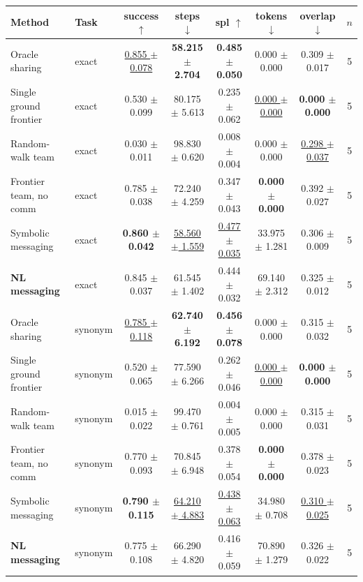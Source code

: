 \begin{tabular}{llcccccc}
\toprule
Method & Task & success $\uparrow$ & steps $\downarrow$ & spl $\uparrow$ & tokens $\downarrow$ & overlap $\downarrow$ & $n$ \\
\midrule
Oracle sharing & exact & \underline{0.855 $\pm$ 0.078} & \textbf{58.215 $\pm$ 2.704} & \textbf{0.485 $\pm$ 0.050} & 0.000 $\pm$ 0.000 & 0.309 $\pm$ 0.017 & 5 \\
Single ground frontier & exact & 0.530 $\pm$ 0.099 & 80.175 $\pm$ 5.613 & 0.235 $\pm$ 0.062 & \underline{0.000 $\pm$ 0.000} & \textbf{0.000 $\pm$ 0.000} & 5 \\
Random-walk team & exact & 0.030 $\pm$ 0.011 & 98.830 $\pm$ 0.620 & 0.008 $\pm$ 0.004 & 0.000 $\pm$ 0.000 & \underline{0.298 $\pm$ 0.037} & 5 \\
Frontier team, no comm & exact & 0.785 $\pm$ 0.038 & 72.240 $\pm$ 4.259 & 0.347 $\pm$ 0.043 & \textbf{0.000 $\pm$ 0.000} & 0.392 $\pm$ 0.027 & 5 \\
Symbolic messaging & exact & \textbf{0.860 $\pm$ 0.042} & \underline{58.560 $\pm$ 1.559} & \underline{0.477 $\pm$ 0.035} & 33.975 $\pm$ 1.281 & 0.306 $\pm$ 0.009 & 5 \\
\textbf{NL messaging} & exact & 0.845 $\pm$ 0.037 & 61.545 $\pm$ 1.402 & 0.444 $\pm$ 0.032 & 69.140 $\pm$ 2.312 & 0.325 $\pm$ 0.012 & 5 \\
\midrule
Oracle sharing & synonym & \underline{0.785 $\pm$ 0.118} & \textbf{62.740 $\pm$ 6.192} & \textbf{0.456 $\pm$ 0.078} & 0.000 $\pm$ 0.000 & 0.315 $\pm$ 0.032 & 5 \\
Single ground frontier & synonym & 0.520 $\pm$ 0.065 & 77.590 $\pm$ 6.266 & 0.262 $\pm$ 0.046 & \underline{0.000 $\pm$ 0.000} & \textbf{0.000 $\pm$ 0.000} & 5 \\
Random-walk team & synonym & 0.015 $\pm$ 0.022 & 99.470 $\pm$ 0.761 & 0.004 $\pm$ 0.005 & 0.000 $\pm$ 0.000 & 0.315 $\pm$ 0.031 & 5 \\
Frontier team, no comm & synonym & 0.770 $\pm$ 0.093 & 70.845 $\pm$ 6.948 & 0.378 $\pm$ 0.054 & \textbf{0.000 $\pm$ 0.000} & 0.378 $\pm$ 0.023 & 5 \\
Symbolic messaging & synonym & \textbf{0.790 $\pm$ 0.115} & \underline{64.210 $\pm$ 4.883} & \underline{0.438 $\pm$ 0.063} & 34.980 $\pm$ 0.708 & \underline{0.310 $\pm$ 0.025} & 5 \\
\textbf{NL messaging} & synonym & 0.775 $\pm$ 0.108 & 66.290 $\pm$ 4.820 & 0.416 $\pm$ 0.059 & 70.890 $\pm$ 1.279 & 0.326 $\pm$ 0.022 & 5 \\
\midrule

\end{tabular}
